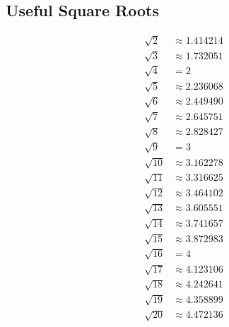 
\subsection*{Useful Square Roots}
\begin{align*}
 \sqrt{2} & \approx 1.414214 \\
 \sqrt{3} & \approx 1.732051 \\
 \sqrt{4} & = 2\\
 \sqrt{5} & \approx 2.236068 \\
 \sqrt{6} & \approx 2.449490 \\
 \sqrt{7} & \approx 2.645751 \\
 \sqrt{8} & \approx 2.828427 \\
 \sqrt{9} & = 3\\
\sqrt{10} & \approx 3.162278 \\
\sqrt{11} & \approx 3.316625 \\
\sqrt{12} & \approx 3.464102 \\
\sqrt{13} & \approx 3.605551 \\
\sqrt{14} & \approx 3.741657 \\
\sqrt{15} & \approx 3.872983 \\
\sqrt{16} & = 4\\
\sqrt{17} & \approx 4.123106 \\
\sqrt{18} & \approx 4.242641 \\
\sqrt{19} & \approx 4.358899 \\
\sqrt{20} & \approx 4.472136 \\
\end{align*}
